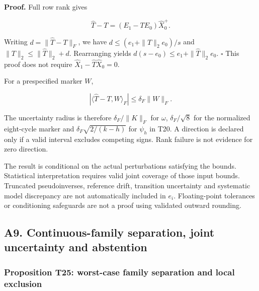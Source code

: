 \documentclass[11pt,a4paper]{article}
\begin{document}
\par
\noindent\begin{minipage}{\linewidth}

\textbf{Proof.} Full row rank gives

\[
\widehat T-T=(E_1-TE_0)\widehat X_0^+.
\]

\end{minipage}\par

Writing \(d=\|\widehat T-T\|_F\), we have \(d\le(e_1+\|T\|_2e_0)/s\) and
\(\|T\|_2\le\|\widehat T\|_2+d\). Rearranging yields
\(d(s-e_0)\le e_1+\|\widehat T\|_2e_0\). \(\square\) This proof does not
require \(\widehat X_1-\widehat T\widehat X_0=0\).

\par
\noindent\begin{minipage}{\linewidth}

For a prespecified marker \(W\),

\[
|\langle\widehat T-T,W\rangle_F|\le\delta_F\|W\|_F.
\]

\end{minipage}\par

The uncertainty radius is therefore \(\delta_F/\|K\|_F\) for \(\omega\),
\(\delta_F/\sqrt8\) for the normalized eight-cycle marker and
\(\delta_F\sqrt{2/(k-h)}\) for \(\psi_h\) in T20. A direction is
declared only if a valid interval excludes competing signs. Rank failure
is not evidence for zero direction.

The result is conditional on the actual perturbations satisfying the
bounds. Statistical interpretation requires valid joint coverage of
those input bounds. Truncated pseudoinverses, reference drift,
transition uncertainty and systematic model discrepancy are not
automatically included in \(e_i\). Floating-point tolerances or
conditioning safeguards are not a proof using validated outward
rounding.

\subsection{A9. Continuous-family separation, joint uncertainty and
abstention}\label{a9.-continuous-family-separation-joint-uncertainty-and-abstention}

\subsubsection{Proposition T25: worst-case family separation and local
exclusion}\label{proposition-t25-worst-case-family-separation-and-local-exclusion}
\end{document}

